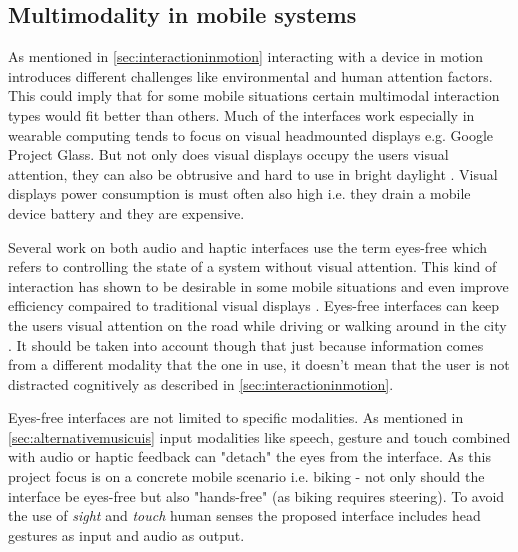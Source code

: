 \subsection{Multimodality in mobile systems}
As mentioned in \ref{sec:interactioninmotion} interacting with a device in motion introduces different challenges like environmental and human attention factors. This could imply that for some mobile situations certain multimodal interaction types would fit better than others. Much of the interfaces work especially in wearable computing tends to focus on visual headmounted displays \cite{barfield_fundamentals_2000} e.g. Google Project Glass. But not only does visual displays occupy the users visual attention, they can also be obtrusive and hard to use in bright daylight \cite{geelhoed_safety_2000}. Visual displays power consumption is must often also high i.e. they drain a mobile device battery and they are expensive.

Several work on both audio \cite{kajastila_eyes-free_2013,bonner_no-look_2010,brewster_multimodaleyes-freeinteraction_2003,zhao_earpod:_2007,vazquez-alvarez_eyes-free_2011} and haptic \cite{pasquero_haptic_2011,pielot_tactile_2011} interfaces use the term eyes-free which refers to controlling the state of a system without visual attention. This kind of interaction has shown to be desirable in some mobile situations \cite{oakley_designing_2007,yi_exploring_2012} and even improve efficiency compaired to traditional visual displays \cite{zhao_earpod:_2007}. Eyes-free interfaces can keep the users visual attention on the road while driving \cite{sodnik_user_2008} or walking around in the city \cite{vazquez-alvarez_eyes-free_2011}. It should be taken into account though that just because information comes from a different modality that the one in use, it doesn't mean that the user is not distracted cognitively as described in \ref{sec:interactioninmotion}.

Eyes-free interfaces are not limited to specific modalities. As mentioned in \ref{sec:alternativemusicuis} input modalities like speech, gesture and touch combined with audio or haptic feedback can "detach" the eyes from the interface. As this project focus is on a concrete mobile scenario i.e. biking - not only should the interface be eyes-free but also "hands-free" (as biking requires steering). To avoid the use of \textit{sight} and \textit{touch} human senses the proposed interface includes head gestures as input and audio as output.

